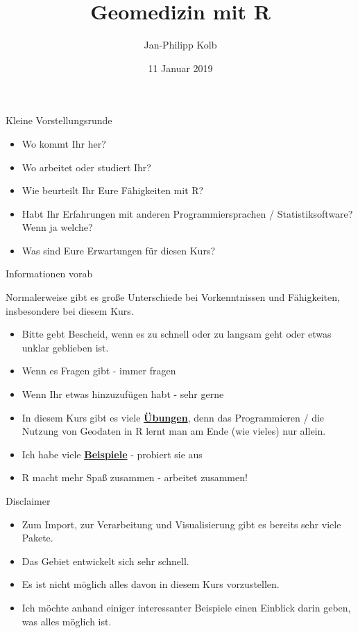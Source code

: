 \documentclass[ignorenonframetext,]{beamer}
\title{Geomedizin mit R}
\author{Jan-Philipp Kolb}
\date{11 Januar 2019}
\providecommand{\tightlist}{%
  \setlength{\itemsep}{0pt}\setlength{\parskip}{0pt}}
\begin{document}
\frame{\titlepage}

\begin{frame}{Kleine Vorstellungsrunde}

\begin{itemize}
\tightlist
\item
  Wo kommt Ihr her?
\item
  Wo arbeitet oder studiert Ihr?
\item
  Wie beurteilt Ihr Eure Fähigkeiten mit R?
\item
  Habt Ihr Erfahrungen mit anderen Programmiersprachen /
  Statistiksoftware? Wenn ja welche?
\item
  Was sind Eure Erwartungen für diesen Kurs?
\end{itemize}

\end{frame}

\begin{frame}{Informationen vorab}

Normalerweise gibt es große Unterschiede bei Vorkenntnissen und
Fähigkeiten, insbesondere bei diesem Kurs.

\begin{itemize}
\tightlist
\item
  Bitte gebt Bescheid, wenn es zu schnell oder zu langsam geht oder
  etwas unklar geblieben ist.
\item
  Wenn es Fragen gibt - immer fragen
\item
  Wenn Ihr etwas hinzuzufügen habt - sehr gerne
\item
  In diesem Kurs gibt es viele
  \href{http://web.math.ku.dk/~helle/R-intro/exercises.pdf}{\textbf{Übungen}},
  denn das Programmieren / die Nutzung von Geodaten in R lernt man am
  Ende (wie vieles) nur allein.
\item
  Ich habe viele \href{https://www.showmeshiny.com/}{\textbf{Beispiele}}
  - probiert sie aus
\item
  R macht mehr Spaß zusammen - arbeitet zusammen!
\end{itemize}

\end{frame}

\begin{frame}{Disclaimer}

\begin{itemize}
\tightlist
\item
  Zum Import, zur Verarbeitung und Visualisierung gibt es bereits sehr
  viele Pakete.
\item
  Das Gebiet entwickelt sich sehr schnell.
\item
  Es ist nicht möglich alles davon in diesem Kurs vorzustellen.
\item
  Ich möchte anhand einiger interessanter Beispiele einen Einblick darin
  geben, was alles möglich ist.
\end{itemize}

\end{frame}
\end{document}
